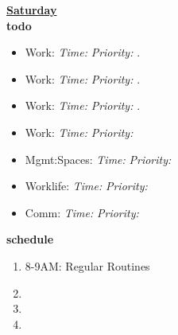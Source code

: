 \documentclass[11pt]{article}
\newcommand{\timeEst}[1]{\textit{Time:} \textit{#1}}
\newcommand{\priority}[1]{\textit{Priority:} \textit{#1}}
\newcommand{\deadline}[1]{#1}
\begin{document}
{            
            \textbf{\small \underline{Saturday}} \\
            \textbf{\small todo} \\
            \begin{itemize} 
              \tiny \item \tiny Work:                                      \deadline{} \timeEst{} \priority{}. 
            \item \tiny Work:                                              \deadline{ }   \timeEst{}  \priority{}.
            \item \tiny Work:                                              \deadline{ }   \timeEst{}  \priority{}. 
            \item \tiny Work:                                              \deadline{} \timeEst{} \priority{} 
            \item \tiny Mgmt:Spaces:                                       \deadline{} \timeEst{} \priority{} 
            \item \tiny Worklife:                                          \deadline{} \timeEst{} \priority{} 
            \item \tiny Comm:                                              \deadline{} \timeEst{} \priority{} 
            \end{itemize} 
            \textbf{\small schedule} \\
            \begin{enumerate}
              \tiny \item \tiny 8-9AM: Regular Routines 
            \item \tiny 
            \item \tiny 
            \item \tiny   
            \end{enumerate} 

}
\end{document}
